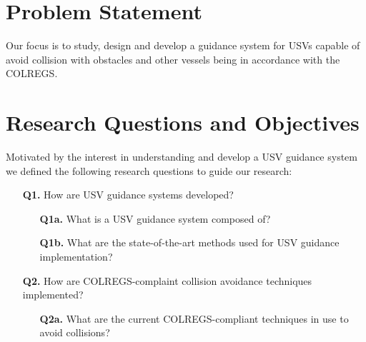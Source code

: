     \section{Problem Statement}
    \label{sec:problem_statement}

    Our focus is to study, design and develop a guidance system for \acfp{USV} capable of avoid collision with obstacles and other vessels being in accordance with the \ac{COLREGS}.

    \section{Research Questions and Objectives}
    \label{sec:Research_Questions_and_Objectives}

    
        Motivated by the interest in understanding and develop a \ac{USV} guidance system we defined the following research questions to guide our research:
        
        \begin{center}
        \begin{itemize}
        \item [\textbf{Q1.}] How are \ac{USV} guidance systems developed?
            \begin{itemize}
            \item [\textbf{Q1a.}] What is a \ac{USV} guidance system composed of?
            \item [\textbf{Q1b.}] What are the state-of-the-art methods used for \ac{USV} guidance implementation?
            \end{itemize}
        \item [\textbf{Q2.}] How are \ac{COLREGS}-complaint collision avoidance techniques implemented?
            \begin{itemize}
            \item [\textbf{Q2a.}] What are the current \ac{COLREGS}-compliant techniques in use to avoid collisions?
            \end{itemize}
        \end{itemize}
        \end{center}
        
